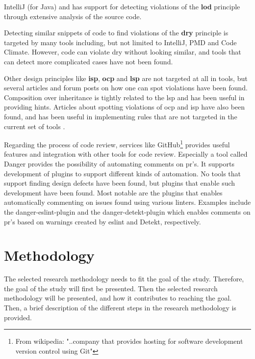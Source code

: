 \documentclass{report}
\begin{document}
IntelliJ \cite{IntelliJ} (for Java) and \cite{pmd} has support for detecting violations of the \textbf{\gls{lod}} principle through extensive analysis of the source code.

Detecting similar snippets of code to find violations of the \textbf{\gls{dry}} principle is targeted by many tools including, but not limited to IntelliJ\cite{IntelliJ}, PMD\cite{pmd} and Code Climate\cite{codeclimate}. However, code can violate \gls{dry} without looking similar, and tools that can detect more complicated cases have not been found.  

Other design principles like \textbf{\gls{isp}}, \textbf{\gls{ocp}} and \textbf{\gls{lsp}} are not targeted at all in tools, but several articles and forum posts on how one can spot violations have been found. Composition over inheritance is tightly related to the \gls{lsp} and \cite{composition-over-inheritance-stackoverflow} has been useful in providing hints. Articles about spotting violations of \gls{ocp} and \gls{isp} have also been found, and has been useful in implementing rules that are not targeted in the current set of tools \cite{ocp-violations} \cite{ocp2} \cite{isp-violation}.

Regarding the process of code review, services like GitHub\cite{github}\footnote{From wikipedia: "..company that provides hosting for software development version control using Git"\cite{github-wiki}} provides useful features and integration with other tools for code review. Especially a tool called Danger\cite{danger} provides the possibility of automating comments on \gls{pr}'s. It supports development of plugins to support different kinds of automation. No tools that support finding design defects have been found, but plugins that enable such development have been found. Most notable are the plugins that enables automatically commenting on issues found using various linters. Examples include the danger-eslint-plugin\cite{danger-eslint-plugin} and the danger-detekt-plugin\cite{danger-detekt-plugin} which enables comments on \gls{pr}'s based on warnings created by eslint\cite{eslint} and Detekt\cite{detekt}, respectively. 

\chapter{Methodology}
\label{methodology}
The selected research methodology needs to fit the goal of the study. Therefore, the goal of the study will first be presented. Then the selected research methodology will be presented, and how it contributes to reaching the goal. Then, a brief description of the different steps in the research methodology is provided. 
\end{document}
